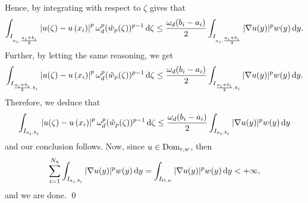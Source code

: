 \documentclass[11pt,leqno]{amsart}
\theoremstyle{remark}
\theoremstyle{definition}
\theoremstyle{definition}
\newcommand{\wstar}{{\hat w}}
\def\de{{\rm d}}
\begin{document}
Hence, by integrating with respect to $\zeta$ gives that
\begin{equation*}
\int_{I_{a_{i},\frac{a_i+b_i}{2}}}
\left|u(\zeta)-u\left(x_{i}\right)\right|^{p}\omega_{d}^{p}(\wstar_{p}(\zeta))^{p-1}\,\de \zeta\leq\frac{\omega_{d}(b_{i}-a_{i})}{2}
\int_{I_{a_{i},\frac{a_i+b_i}{2}}}|\nabla u(y)|^{p}w(y)\,\de y.
\end{equation*}
Further, by letting the same reasoning, we get
\begin{equation*}
\int_{I_{\frac{a_i+b_i}{2},b_{i}}}
\left|u(\zeta)-u\left(x_{i}\right)\right|^{p}\omega_{d}^{p}(\wstar_{p}(\zeta))^{p-1}\,\de \zeta\leq\frac{\omega_{d}(b_{i}-a_{i})}{2}
\int_{I_{\frac{a_i+b_i}{2},b_{i}}}|\nabla u(y)|^{p}w(y)\,\de y.
\end{equation*}
Therefore, we deduce that
\begin{equation*}
\int_{I_{a_{i},b_{i}}}
\left|u(\zeta)-u\left(x_{i}\right)\right|^{p}\omega_{d}^{p}(\wstar_{p}(\zeta))^{p-1}\,\de \zeta\leq\frac{\omega_{d}(b_{i}-a_{i})}{2}
\int_{I_{a_{i},b_{i}}}|\nabla u(y)|^{p}w(y)\,\de y
\end{equation*}
and our conclusion follows. Now, since $u\in {\rm{Dom}}_{{\mathrm r},w}$, then
\begin{equation*}
\sum_{i=1}^{N_{\eta}}
\int_{I_{a_{i},b_{i}}}|\nabla u(y)|^{p}w(y)\,\de y=\int_{I_{\Omega,w}}|\nabla u(y)|^{p}w(y)\,\de y<+\infty,
\end{equation*}
and we are done.
\qed
\end{document}
